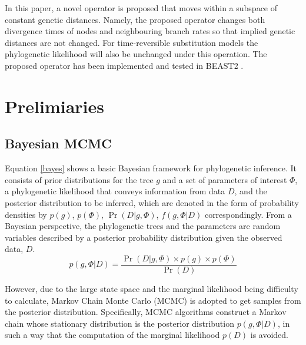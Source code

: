 \documentclass{bmcart}
\begin{document}
In this paper, a novel operator is proposed that moves within a subspace of constant genetic distances. 
Namely, the proposed operator changes both divergence times of nodes and neighbouring branch rates so that implied genetic distances are not changed. 
For time-reversible substitution models the phylogenetic likelihood will also be unchanged under this operation. 
The proposed operator has been implemented and tested in BEAST2 \cite{}. 

\section*{Prelimiaries}
\subsection*{Bayesian MCMC}
Equation \ref{bayes} shows a basic Bayesian framework for phylogenetic inference. It consists of prior distributions for the tree $g$ and a set of parameters of interest $\Phi $, a phylogenetic likelihood that conveys information from data $D$, and the posterior distribution to be inferred, which are denoted in the form of probability densities by $p(g) $, $p(\Phi )$, $\Pr(D|g,\Phi )$, $f(g,\Phi |D)$ correspondingly. From a Bayesian perspective, the phylogenetic trees and the parameters are random variables described by a posterior probability distribution given the observed data, $D$. 
\begin{equation}\label{bayes}
p(g,\Phi |D) = \frac{{\Pr (D|g,\Phi ) \times p (g) \times p (\Phi )}}{{\Pr (D)}}
\end{equation}

However, due to the large state space and the marginal likelihood being difficulty to calculate, Markov Chain Monte Carlo (MCMC) is adopted to get samples from the posterior distribution. Specifically, MCMC algorithms construct a Markov chain whose stationary distribution is the posterior distribution $p(g,\Phi |D)$, in such a way that the computation of the marginal likelihood $p (D)$ is avoided. 
\end{document}
